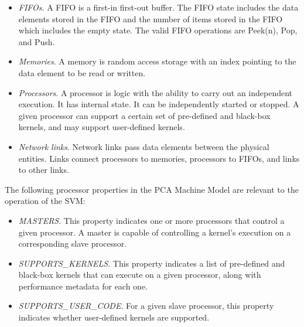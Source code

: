 \begin{itemize}

\item {\it FIFOs}.  A FIFO is a first-in first-out buffer.  The FIFO
state includes the data elements stored in the FIFO and the number of
items stored in the FIFO which includes the empty state.  The valid
FIFO operations are Peek(n), Pop, and Push.

\item {\it Memories}. A memory is random access storage with an index
pointing to the data element to be read or written.

\item {\it Processors}. A processor is logic with the ability to carry
out an independent execution.  It has internal state.  It can be
independently started or stopped.  A given processor can support a
certain set of pre-defined and black-box kernels, and may support
user-defined kernels.

\item {\it Network links}. Network links pass data elements between
the physical entities.  Links connect processors to memories,
processors to FIFOs, and links to other links.

\end{itemize}


The following processor properties in the PCA Machine Model are
relevant to the operation of the SVM:

\begin{itemize}

\item {\it MASTERS}.  This property indicates one or more processors
that control a given processor.  A master is capable of controlling a
kernel's execution on a corresponding slave processor.


\item {\it SUPPORTS\_KERNELS}.  This property indicates a list of
pre-defined and black-box kernels that can execute on a given
processor, along with performance metadata for each one.

\item {\it SUPPORTS\_USER\_CODE}.  For a given slave processor, this
property indicates whether user-defined kernels are supported.

\end{itemize}


